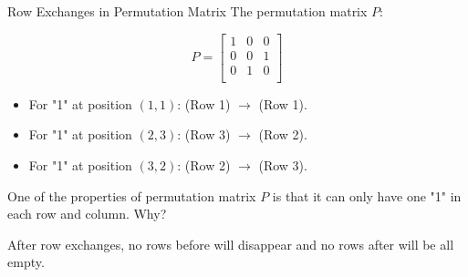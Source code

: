 \documentclass{beamer}
\begin{document}
\begin{frame}{Row Exchanges in Permutation Matrix}
The permutation matrix $P$:

\begin{equation*}
    P=\left[ \begin{matrix}
        1&		0&		0\\
        0&		0&		1\\
        0&		1&		0\\
    \end{matrix} \right]
\end{equation*}

\begin{itemize}
    \item For "1" at position $(1,1)$: (Row 1) $\rightarrow$ (Row 1).
    \item For "1" at position $(2,3)$: (Row 3) $\rightarrow$ (Row 2).
    \item For "1" at position $(3,2)$: (Row 2) $\rightarrow$ (Row 3).
\end{itemize}

One of the properties of permutation matrix $P$ is that it can only have one "1" in each row and column. Why?

\vspace{3pt}
After row exchanges, no rows before will disappear and no rows after will be all empty.
\end{frame}
\end{document}
